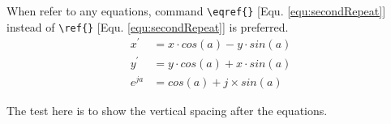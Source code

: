 When refer to any equations, command \verb|\eqref{}| [Equ. \eqref{equ:secondRepeat}] instead of \verb|\ref{}| [Equ. \ref{equ:secondRepeat}] is preferred. 
\begin{align}
x^{'} 	& 	= x \cdot cos(a) - y \cdot sin(a)  	   			\\
y^{'}  &	= y \cdot cos(a) + x \cdot sin(a)  				\\
e^{ja} & 	=cos(a)+j \times sin(a)	 	
\label{equ:secondRepeat}
\end{align}

The test here is to show the vertical spacing after the equations. 

\pagebreak[4] %
